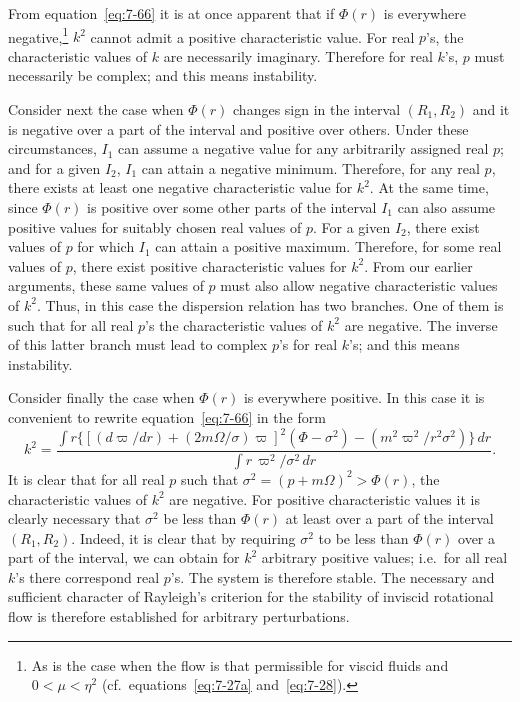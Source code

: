 From equation~\eqref{eq:7-66} it is at once apparent that if $\Phi(r)$ is everywhere
negative,\footnote{As is the case when the flow is that permissible for viscid fluids and $0<\mu<\eta^2$
(cf.\ equations~\eqref{eq:7-27a} and~\eqref{eq:7-28}).}
$k^2$ cannot admit a positive characteristic value.  For real $p$'s,
the characteristic values of $k$ are necessarily imaginary.  Therefore
for real $k$'s, $p$ must necessarily be complex; and this means instability.

Consider next the case when $\Phi(r)$ changes sign in the interval $(R_1, R_2)$
and it is negative over a part of the interval and positive over others.
Under these circumstances, $I_1$ can assume a negative value for any
arbitrarily assigned real $p$; and for a given $I_2$, $I_1$ can attain a negative
minimum.  Therefore, for any real $p$, there exists at least one negative
characteristic value for $k^2$.  At the same time, since $\Phi(r)$ is positive over
some other parts of the interval $I_1$ can also assume positive values for
suitably chosen real values of $p$.  For a given $I_2$, there exist values of
$p$ for which $I_1$ can attain a positive maximum.  Therefore, for some
real values of $p$, there exist positive characteristic values for $k^2$.  From
our earlier arguments, these same values of $p$ must also allow negative
characteristic values of $k^2$.  Thus, in this case the dispersion relation
has two branches.  One of them is such that for all real $p$'s the characteristic values of $k^2$ are negative.  The inverse of this latter branch must
lead to complex $p$'s for real $k$'s; and this means instability.

Consider finally the case when $\Phi(r)$ is everywhere positive.  In this
case it is convenient to rewrite equation~\eqref{eq:7-66} in the form
\begin{equation}
\label{eq:7-81}
k^2 = \frac{\displaystyle\int
r\{[(d\varpi/dr)+(2m\Omega/\sigma)\varpi]^2(\Phi-\sigma^2)
- (m^2\varpi^2/r^2\sigma^2)\}\,dr}
{\displaystyle\int r\,\varpi^2/\sigma^2\,dr}.
\end{equation}
It is clear that for all real $p$ such that $\sigma^2 = (p+m\Omega)^2 > \Phi(r)$, the characteristic values of $k^2$ are negative.  For positive characteristic values it is
clearly necessary that $\sigma^2$ be less than $\Phi(r)$ at least over a part of the
interval $(R_1, R_2)$.  Indeed, it is clear that by requiring $\sigma^2$ to be less than
$\Phi(r)$ over a part of the interval, we can obtain for $k^2$ arbitrary positive
values; i.e.\ for all real $k$'s there correspond real $p$'s.  The system is
therefore stable.  The necessary and sufficient character of Rayleigh's
criterion for the stability of inviscid rotational flow is therefore established for arbitrary perturbations.

